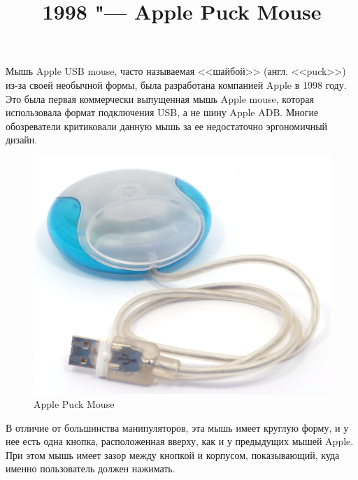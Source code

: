 \documentclass[11pt, a4paper]{article}
\begin{document}
\title{1998 "--- Apple Puck Mouse}
\date{}
\maketitle
Мышь Apple USB mouse, часто называемая <<шайбой>> (англ. <<puck>>)  из-за своей необычной формы, была разработана компанией Apple в 1998 году. Это была первая коммерчески выпущенная мышь Apple mouse, которая использовала формат подключения USB, а не шину Apple ADB. Многие обозреватели критиковали данную мышь за ее недостаточно эргономичный дизайн.

\begin{figure}[h]
    \centering
    \includegraphics[scale=0.6]{1998_apple_puck/apple60.jpg}
    \caption{Apple Puck Mouse}
    \label{fig:pic}
\end{figure}

В отличие от большинства манипуляторов, эта мышь имеет круглую форму, и у нее есть одна кнопка, расположенная вверху, как и у предыдущих мышей Apple. При этом мышь имеет зазор между кнопкой и корпусом, показывающий, куда именно пользователь должен нажимать.
\end{document}

